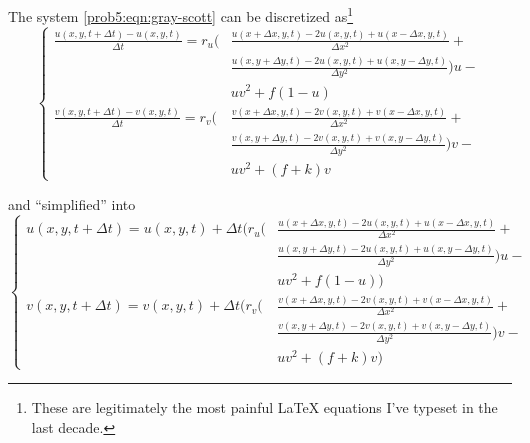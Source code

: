 The system \autoref{prob5:eqn:gray-scott} can be discretized as\footnote{These are legitimately the most painful \LaTeX{} equations I've typeset in the last decade.}
\begin{equation}
    \begin{cases}
        \displaystyle{\frac{u(x, y, t + \Delta t) - u(x, y, t)}{\Delta t}} = r_u \bigg( & \displaystyle{\frac{u(x + \Delta x, y, t) - 2u(x, y, t) + u(x - \Delta x, y, t)}{\Delta x^2} +}         \\
                                                                                        & \displaystyle{\frac{u(x, y + \Delta y, t) - 2u(x, y, t) + u(x, y - \Delta y, t)}{\Delta y^2}\bigg)u - } \\
                                                                                        & \displaystyle{uv^2 + f(1 - u)}                                                                          \\[20pt]
        \displaystyle{\frac{v(x, y, t + \Delta t) - v(x, y, t)}{\Delta t}} = r_v \bigg( & \displaystyle{\frac{v(x + \Delta x, y, t) - 2v(x, y, t) + v(x - \Delta x, y, t)}{\Delta x^2} +}         \\
                                                                                        & \displaystyle{\frac{v(x, y + \Delta y, t) - 2v(x, y, t) + v(x, y - \Delta y, t)}{\Delta y^2}\bigg)v - } \\
                                                                                        & \displaystyle{uv^2 + (f + k)v}
    \end{cases}\label{prob5:eqn:discretized-dogshit}
\end{equation}

and ``simplified'' into
\begin{equation}
    \begin{cases}
        u(x, y, t + \Delta t) = u(x, y, t) + \Delta t \Bigg( r_u \bigg( & \displaystyle{\frac{u(x + \Delta x, y, t) - 2u(x, y, t) + u(x - \Delta x, y, t)}{\Delta x^2} +}         \\
                                                                        & \displaystyle{\frac{u(x, y + \Delta y, t) - 2u(x, y, t) + u(x, y - \Delta y, t)}{\Delta y^2}\bigg)u - } \\
                                                                        & \displaystyle{uv^2 + f(1 - u) \Bigg)}                                                                   \\[20pt]
        v(x, y, t + \Delta t) = v(x, y, t) + \Delta t \Bigg( r_v \bigg( & \displaystyle{\frac{v(x + \Delta x, y, t) - 2v(x, y, t) + v(x - \Delta x, y, t)}{\Delta x^2} +}         \\
                                                                        & \displaystyle{\frac{v(x, y + \Delta y, t) - 2v(x, y, t) + v(x, y - \Delta y, t)}{\Delta y^2}\bigg)v - } \\
                                                                        & \displaystyle{uv^2 + (f + k)v \Bigg)}
    \end{cases}\label{prob5:eqn:discretized-dogshit}
\end{equation}

